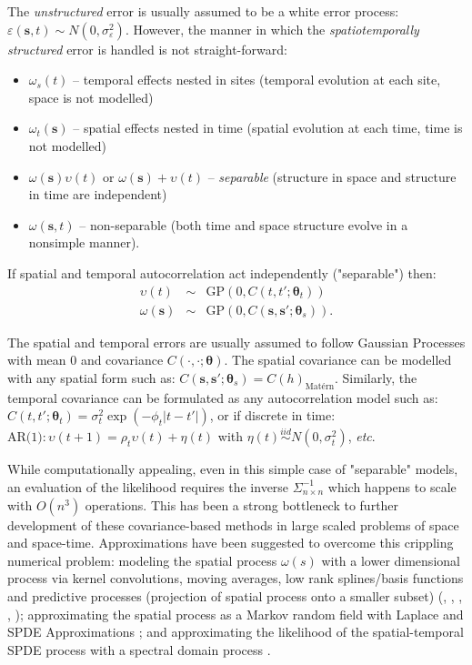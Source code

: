 \documentclass[letterpaper,portrait,11pt]{scrartcl}
\numberwithin{equation}{section}    %
\numberwithin{figure}{section}    %
\numberwithin{table}{section}       %
\begin{document}
The \textit{unstructured} error is usually assumed to be a white error process: $\varepsilon(\bm{s},t) \sim N(0, \sigma^2_\varepsilon)$. However, the manner in which the   \textit{spatiotemporally structured} error is handled is not straight-forward:

\begin{itemize}
  \item $\omega_s(t)$ -- temporal effects nested in sites (temporal evolution at each site, space is not modelled)
  \item $\omega_t(\bm{s})$ -- spatial effects nested in time (spatial evolution at each time, time is not modelled)
  \item $\omega(\bm{s})  \upsilon(t)$ or $\omega(\bm{s}) + \upsilon(t)$ -- \textit{separable} (structure in space and structure in time are independent)
  \item $\omega(\bm{s},t)$ -- non-separable (both time and space structure evolve in a nonsimple manner).
\end{itemize}

If spatial and temporal autocorrelation act independently ("separable") then: \\
\begin{eqnarray*}
  \upsilon(t) &\sim& \text{GP}(0, C(t,t'; \bm{\theta}_t))  \\
  \omega(\bm{s}) &\sim& \text{GP}(0, C(\bm{s},\bm{s}'; \bm{\theta}_s)) .
\end{eqnarray*}

The spatial and temporal errors are usually assumed to follow Gaussian Processes with mean 0 and covariance $C(\cdotp, \cdotp; \bm{\theta})$. The spatial covariance can be modelled with any spatial form such as: $C(\bm{s},\bm{s}'; \bm{\theta}_s) = C(h)_{\text{Mat\'{e}rn}}$. Similarly, the temporal covariance can be formulated as any autocorrelation model such as: $C(t,t'; \bm{\theta}_t) = \sigma^2_t \exp(-\phi_t |t-t'|)$, or if discrete in time: $\text{AR(1)}: \upsilon(t+1)=\rho_t \upsilon(t) + \eta(t)$ with $\eta(t) \stackrel{iid}{\sim} N(0,\sigma^2_t)$, \textit{etc}.


While computationally appealing, even in this simple case of "separable" models, an evaluation of the likelihood requires the inverse $\Sigma^{-1}_{n\times n}$ which happens to scale with $O(n^3)$ operations. This has been a strong bottleneck to further development of these covariance-based methods in large scaled problems of space and space-time. Approximations have been suggested to overcome this crippling numerical problem: modeling the spatial process $\omega(s)$ with a lower dimensional process via kernel convolutions, moving averages, low rank splines/basis functions and predictive processes (projection of spatial process onto a smaller subset) (\cite{solna1996time}, \cite{wikle1999dimension}, \cite{hung2004decadal}, \cite{xu2005kernel}, \cite{banerjee2014hierarchical}); approximating the spatial process as a Markov random field with Laplace and SPDE Approximations \parencite{rinla:2015}; and approximating the likelihood of the spatial-temporal SPDE process with a spectral domain process \parencite{sigrist2015stochastic}.
\end{document}
